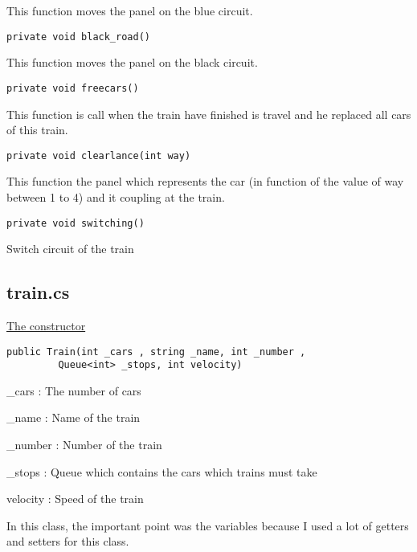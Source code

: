\documentclass[12pt]{article}
\begin{document}
This function moves the panel on the blue circuit.\\

\begin{lstlisting}[frame=single]
private void black_road()
\end{lstlisting}

This function moves the panel on the black circuit.\\

\begin{lstlisting}[frame=single]
private void freecars()
\end{lstlisting}

This function is call when the train have finished is travel and he replaced all cars of this train.\\

\begin{lstlisting}[frame=single]
private void clearlance(int way)
\end{lstlisting}

This function the panel which represents the car (in function of the value of way between 1 to 4) and it coupling at the train.\\

\begin{lstlisting}[frame=single]
private void switching()
\end{lstlisting}

Switch circuit of the train\\

\subsection{train.cs}

\underline{The constructor}

\begin{lstlisting}[frame=single]
public Train(int _cars , string _name, int _number , 
	     Queue<int> _stops, int velocity)

\end{lstlisting}

\_cars		: The number of cars

\_name		: Name of the train

\_number 	: Number of the train

\_stops		: Queue which contains the cars which trains must take

velocity	: Speed of the train

\quad

In this class, the important point was the variables because I used a lot of getters and setters for this class.\\
\end{document}

